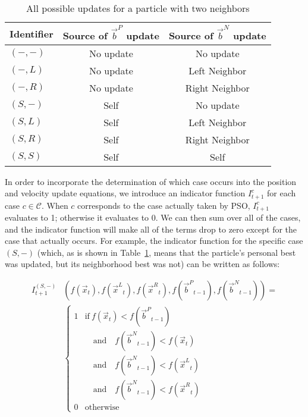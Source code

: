 \documentclass[smallcondensed]{svjour3}
\providecommand{\pers}{\ensuremath{P}}
\providecommand{\neigh}{\ensuremath{N}}
\providecommand{\leftind}{\ensuremath{L}}
\providecommand{\rightind}{\ensuremath{R}}
\providecommand{\ppos}{\ensuremath{\Vec{x}}}
\providecommand{\nbest}{\ensuremath{\Vec{b}^\neigh}}
\providecommand{\pbest}{\ensuremath{\Vec{b}^\pers}}
\providecommand{\ofunc}{\ensuremath{f}}
\providecommand{\indic}{\ensuremath{I}}
\providecommand{\leftn}{\ensuremath{\Vec{x}^\leftind}}
\providecommand{\rightn}{\ensuremath{\Vec{x}^\rightind}}
\providecommand{\caseset}{\ensuremath{\mathcal{C}}}
\providecommand{\casegen}{\ensuremath{c}}
\providecommand{\casexn}{\ensuremath{(S,-)}}
\providecommand{\casexx}{\ensuremath{(S,S)}}
\providecommand{\casexl}{\ensuremath{(S,\leftind)}}
\providecommand{\casexr}{\ensuremath{(S,\rightind)}}
\providecommand{\casepn}{\ensuremath{(-,-)}}
\providecommand{\casepl}{\ensuremath{(-,\leftind)}}
\providecommand{\casepr}{\ensuremath{(-,\rightind)}}
\begin{document}
\begin{table}
  \caption{All possible updates for a particle with two neighbors}
  \label{tab:evals}
  \centering
  \begin{tabular}{lcc}
	Identifier&Source of $\pbest$ update&Source of $\nbest$ update\\
	\hline
	\hline
	$\casepn$&No update&No update\\
	\hline
	$\casepl$&No update&Left Neighbor\\
	\hline
	$\casepr$&No update&Right Neighbor\\
	\hline
	$\casexn$&Self&No update\\
	\hline
	$\casexl$&Self&Left Neighbor\\
	\hline
	$\casexr$&Self&Right Neighbor\\
	\hline
	$\casexx$&Self&Self\\
	\hline
  \end{tabular}
\end{table}

In order to incorporate the determination of which case occurs into the
position and velocity update equations, we introduce an indicator function
$\indic_{t+1}^{\casegen}$ for each case $\casegen \in \caseset$.  When
$\casegen$ corresponds to the case actually taken by PSO,
$\indic_{t+1}^{\casegen}$ evaluates to 1; otherwise it evaluates to 0.  We can
then sum over all of the cases, and the indicator function will make all of the
terms drop to zero except for the case that actually occurs.  For example, the
indicator function for the specific case $\casexn$ (which, as is shown in
Table~\ref{tab:evals}, means that the particle's personal best was updated, but
its neighborhood best was not) can be written as follows:

\begin{align}
  \nonumber
	\indic_{t+1}^{\casexn} & (\ofunc ( \ppos_{t} ) ,\ofunc(\leftn_{t}),
	\ofunc(\rightn_{t}) ,\ofunc(\pbest_{t-1}) ,\ofunc(\nbest_{t-1}))= \\
  \label{eq:deficasexn}
	&\begin{cases}
	   1 & \text{if} \ \ofunc(\ppos_{t}) < \ofunc(\pbest_{t-1}) \\
	   &\quad \text{and} \quad \ofunc(\nbest_{t-1}) < \ofunc(\ppos_{t}) \\
	   &\quad \text{and} \quad \ofunc(\nbest_{t-1}) < \ofunc(\leftn_{t}) \\
	   &\quad \text{and} \quad \ofunc(\nbest_{t-1}) < \ofunc(\rightn_{t}) \\
	   0 & \text{otherwise}
	\end{cases}
\end{align}
\end{document}
